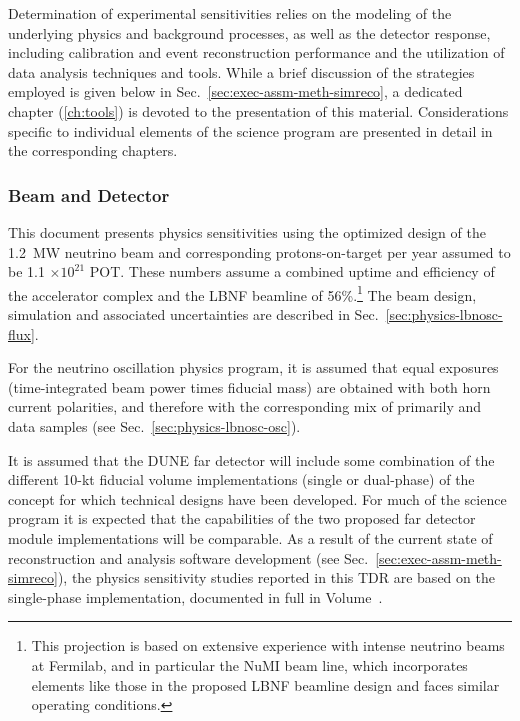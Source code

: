 Determination of experimental sensitivities relies on the
modeling of the underlying physics and background processes,
as well as the detector response, including calibration and
event reconstruction performance and the utilization of data
analysis techniques and tools.
While a brief discussion of the strategies employed is given below
in Sec.~\ref{sec:exec-assm-meth-simreco}, a dedicated chapter
(\ref{ch:tools}) is devoted to the presentation of this material.
Considerations specific to individual elements of the science
program are presented in detail in the corresponding chapters.

\subsubsection{Beam and Detector}
\label{sec:exec-assm-meth-beamdetector}

This document presents physics sensitivities using
the optimized design of the 1.2~MW neutrino beam and
corresponding protons-on-target per year assumed to
be 1.1 $\times 10^{21}$ POT.  These numbers assume a combined
uptime and efficiency of the \fnal accelerator complex and the
LBNF beamline of 56\%.\footnote{This projection is based on extensive 
experience with intense neutrino beams at Fermilab, and in particular 
the NuMI beam line, which incorporates elements like those in the  
proposed LBNF beamline design and faces similar operating conditions.} 
The beam design, simulation and associated
uncertainties are described in
Sec.~\ref{sec:physics-lbnosc-flux}.

For the neutrino oscillation physics program, it is assumed that
equal exposures (time-integrated beam power times fiducial mass) are obtained with both horn current polarities,
and therefore with the corresponding mix of primarily \numu
and \anumu data samples (see Sec.~\ref{sec:physics-lbnosc-osc}).

It is assumed that the DUNE far detector will include some
combination of the different 10-kt fiducial volume
implementations (single or dual-phase) of the \lartpc concept
for which technical designs have been developed.
For much of the science program it is expected that the
capabilities of the two proposed far detector module 
implementations will be comparable.  As a result of the
current state of reconstruction and analysis software development
(see Sec.~\ref{sec:exec-assm-meth-simreco}), the
physics sensitivity studies reported in this TDR are based on
the single-phase \lartpc implementation,
documented in full in Volume~\voltitlesp{}.

